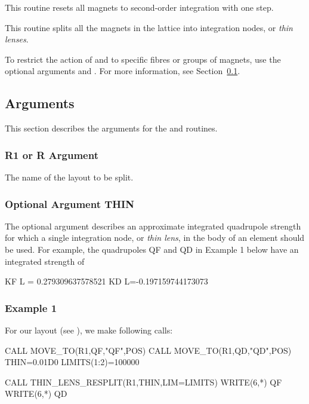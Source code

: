 This routine resets all magnets to second-order integration with one step. 


This routine splits all the magnets in the lattice into integration nodes, or \emph{thin lenses}.

To restrict the action of  and 
to specific fibres or groups of magnets, use the optional arguments  and
. For more information, see Section~\ref{sub:Arguments}.


\subsection{Arguments}
\label{sub:Arguments}

This section describes the arguments for  the  and
 routines.


\subsubsection{R1 or R Argument}

The name of the layout to be split.



\subsubsection{Optional Argument THIN}

The optional argument  describes an approximate integrated quadrupole
strength for which a single integration node, or \emph{thin lens}, in the body of an
element should be used. For example, the quadrupoles QF and QD in Example 1 below
have an integrated strength of
\begin{ptccode}
KF L = 0.279309637578521      KD L=-0.197159744173073
\end{ptccode}
 
 
\subsubsection*{Example 1}

For our  layout (see ), we make following calls:
\begin{ptccode}
CALL MOVE_TO(R1,QF,"QF",POS)
CALL MOVE_TO(R1,QD,"QD",POS)
THIN=0.01D0
LIMITS(1:2)=100000

CALL THIN_LENS_RESPLIT(R1,THIN,LIM=LIMITS)
WRITE(6,*) QF%
WRITE(6,*) QD%
\end{ptccode}


